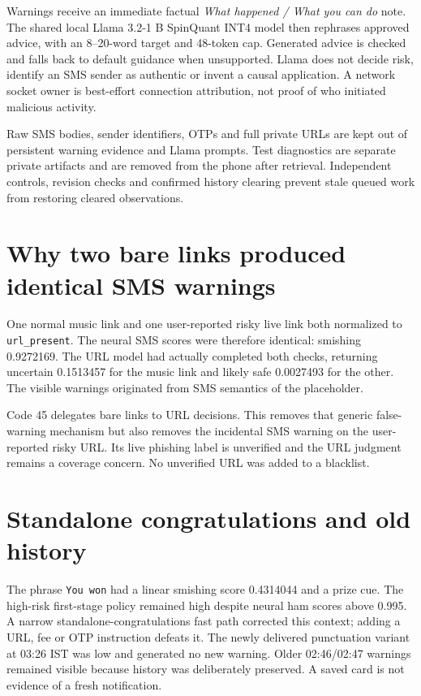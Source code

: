 \documentclass[11pt,a4paper,oneside]{report}
\newcommand{\code}[1]{\nolinkurl{#1}}
\begin{document}
Warnings receive an immediate factual \emph{What happened / What you can do} note. The shared local Llama 3.2-1 B SpinQuant INT4 model then rephrases approved advice, with an 8--20-word target and 48-token cap. Generated advice is checked and falls back to default guidance when unsupported. Llama does not decide risk, identify an SMS sender as authentic or invent a causal application. A network socket owner is best-effort connection attribution, not proof of who initiated malicious activity.

Raw SMS bodies, sender identifiers, OTPs and full private URLs are kept out of persistent warning evidence and Llama prompts. Test diagnostics are separate private artifacts and are removed from the phone after retrieval. Independent controls, revision checks and confirmed history clearing prevent stale queued work from restoring cleared observations.

\section{Why two bare links produced identical SMS warnings}
One normal music link and one user-reported risky live link both normalized to \code{url_present}. The neural SMS scores were therefore identical: smishing 0.9272169. The URL model had actually completed both checks, returning uncertain 0.1513457 for the music link and likely safe 0.0027493 for the other. The visible warnings originated from SMS semantics of the placeholder.

Code 45 delegates bare links to URL decisions. This removes that generic false-warning mechanism but also removes the incidental SMS warning on the user-reported risky URL. Its live phishing label is unverified and the URL judgment remains a coverage concern. No unverified URL was added to a blacklist.

\section{Standalone congratulations and old history}
The phrase \code{You won} had a linear smishing score 0.4314044 and a prize cue. The high-risk first-stage policy remained high despite neural ham scores above 0.995. A narrow standalone-congratulations fast path corrected this context; adding a URL, fee or OTP instruction defeats it. The newly delivered punctuation variant at 03:26 IST was low and generated no new warning. Older 02:46/02:47 warnings remained visible because history was deliberately preserved. A saved card is not evidence of a fresh notification.
\end{document}
